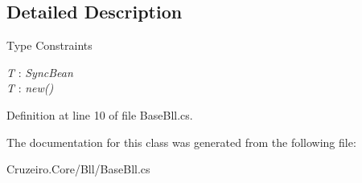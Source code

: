 \subsection{Detailed Description}
\begin{Desc}
\item[Type Constraints]\begin{description}
\item[{\em T} : {\em Sync\+Bean}]\item[{\em T} : {\em new()}]\end{description}
\end{Desc}


Definition at line 10 of file Base\+Bll.\+cs.



The documentation for this class was generated from the following file\+:\begin{DoxyCompactItemize}
\item 
Cruzeiro.\+Core/\+Bll/Base\+Bll.\+cs\end{DoxyCompactItemize}
